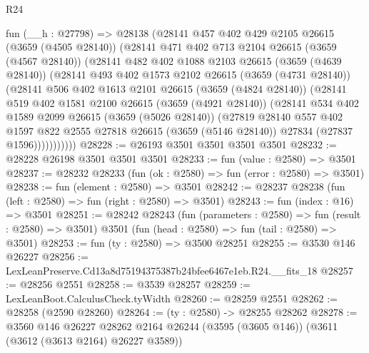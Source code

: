 \begin{lexlean}{R24}
\begin{coremodule}
      fun (__h : @27798) =>
      @28138
        (@28141
          @457
          @402
          @429
          @2105
          @26615
          (@3659 (@4505 @28140))
          (@28141
            @471
            @402
            @713
            @2104
            @26615
            (@3659 (@4567 @28140))
            (@28141
              @482
              @402
              @1088
              @2103
              @26615
              (@3659 (@4639 @28140))
              (@28141
                @493
                @402
                @1573
                @2102
                @26615
                (@3659 (@4731 @28140))
                (@28141
                  @506
                  @402
                  @1613
                  @2101
                  @26615
                  (@3659 (@4824 @28140))
                  (@28141
                    @519
                    @402
                    @1581
                    @2100
                    @26615
                    (@3659 (@4921 @28140))
                    (@28141
                      @534
                      @402
                      @1589
                      @2099
                      @26615
                      (@3659 (@5026 @28140))
                      (@27819
                        @28140
                        @557
                        @402
                        @1597
                        @822
                        @2555
                        @27818
                        @26615
                        (@3659 (@5146 @28140))
                        @27834
                        (@27837 @1596)))))))))))
@28228 := @26193 @3501 @3501 @3501 @3501
@28232 := @28228 @26198 @3501 @3501 @3501
@28233 := fun (value : @2580) => @3501
@28237 := @28232 @28233 (fun (ok : @2580) => fun (error : @2580) => @3501)
@28238 := fun (element : @2580) => @3501
@28242 := @28237 @28238 (fun (left : @2580) => fun (right : @2580) => @3501)
@28243 := fun (index : @16) => @3501
@28251 := @28242
    @28243
    (fun (parameters : @2580) => fun (result : @2580) => @3501)
    @3501
    (fun (head : @2580) => fun (tail : @2580) => @3501)
@28253 := fun (ty : @2580) => @3500 @28251
@28255 := @3530 @146 @26227
@28256 := LexLeanPreserve.Cd13a8d75194375387b24bfee6467e1eb.R24.__fits_18
@28257 := @28256 @2551
@28258 := @3539 @28257
@28259 := LexLeanBoot.CalculusCheck.tyWidth
@28260 := @28259 @2551
@28262 := @28258 (@2590 @28260)
@28264 := (ty : @2580) -> @28255 @28262
@28278 := @3560
    @146
    @26227
    @28262
    @2164
    @26244
    (@3595 (@3605 @146))
    (@3611 (@3612 (@3613 @2164) @26227 @3589))

\end{coremodule}
\end{lexlean}
